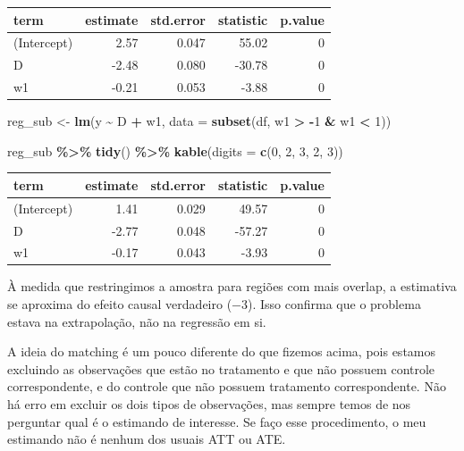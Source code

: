 \documentclass[
]{article}
\newenvironment{Shaded}{\begin{snugshade}}{\end{snugshade}}
\newcommand{\AttributeTok}[1]{\textcolor[rgb]{0.13,0.29,0.53}{#1}}
\newcommand{\DecValTok}[1]{\textcolor[rgb]{0.00,0.00,0.81}{#1}}
\newcommand{\FunctionTok}[1]{\textcolor[rgb]{0.13,0.29,0.53}{\textbf{#1}}}
\newcommand{\NormalTok}[1]{#1}
\newcommand{\OtherTok}[1]{\textcolor[rgb]{0.56,0.35,0.01}{#1}}
\newcommand{\SpecialCharTok}[1]{\textcolor[rgb]{0.81,0.36,0.00}{\textbf{#1}}}
\begin{document}
\begin{tabular}{l|r|r|r|r}
\hline
term & estimate & std.error & statistic & p.value\\
\hline
(Intercept) & 2.57 & 0.047 & 55.02 & 0\\
\hline
D & -2.48 & 0.080 & -30.78 & 0\\
\hline
w1 & -0.21 & 0.053 & -3.88 & 0\\
\hline
\end{tabular}

\begin{Shaded}
\begin{Highlighting}[]
\NormalTok{reg\_sub }\OtherTok{\textless{}{-}} \FunctionTok{lm}\NormalTok{(y }\SpecialCharTok{\textasciitilde{}}\NormalTok{ D }\SpecialCharTok{+}\NormalTok{ w1, }\AttributeTok{data =} \FunctionTok{subset}\NormalTok{(df, w1 }\SpecialCharTok{\textgreater{}} \SpecialCharTok{{-}}\DecValTok{1} \SpecialCharTok{\&}\NormalTok{ w1 }\SpecialCharTok{\textless{}} \DecValTok{1}\NormalTok{))}

\NormalTok{reg\_sub }\SpecialCharTok{\%\textgreater{}\%}
  \FunctionTok{tidy}\NormalTok{() }\SpecialCharTok{\%\textgreater{}\%}
  \FunctionTok{kable}\NormalTok{(}\AttributeTok{digits =} \FunctionTok{c}\NormalTok{(}\DecValTok{0}\NormalTok{, }\DecValTok{2}\NormalTok{, }\DecValTok{3}\NormalTok{, }\DecValTok{2}\NormalTok{, }\DecValTok{3}\NormalTok{))}
\end{Highlighting}
\end{Shaded}

\begin{tabular}{l|r|r|r|r}
\hline
term & estimate & std.error & statistic & p.value\\
\hline
(Intercept) & 1.41 & 0.029 & 49.57 & 0\\
\hline
D & -2.77 & 0.048 & -57.27 & 0\\
\hline
w1 & -0.17 & 0.043 & -3.93 & 0\\
\hline
\end{tabular}

À medida que restringimos a amostra para regiões com mais overlap, a estimativa se aproxima do efeito causal verdadeiro (\(-3\)). Isso confirma que o problema estava na extrapolação, não na regressão em si.

A ideia do matching é um pouco diferente do que fizemos acima, pois estamos excluindo as observações que estão no tratamento e que não possuem controle correspondente, e do controle que não possuem tratamento correspondente. Não há erro em excluir os dois tipos de observações, mas sempre temos de nos perguntar qual é o estimando de interesse. Se faço esse procedimento, o meu estimando não é nenhum dos usuais ATT ou ATE.
\end{document}
